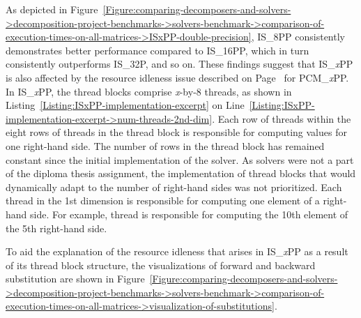 As depicted in Figure~\ref{Figure:comparing-decomposers-and-solvers->decomposition-project-benchmarks->solvers-benchmark->comparison-of-execution-times-on-all-matrices->ISxPP-double-precision}, IS\_8PP consistently demonstrates better performance compared to IS\_16PP, which in turn consistently outperforms IS\_32P, and so on. These findings suggest that IS\_\textit{x}PP is also affected by the resource idleness issue described on Page~\pageref{Paragraph:comparing-decomposers-and-solvers->decomposition-project-benchmarks->decomposers-benchmark->comparison-of-execution-times-on-subset-of-matrices->PCMxPP} for PCM\_\textit{x}PP. In IS\_\textit{x}PP, the thread blocks comprise \textit{x}-by-8 threads, as shown in Listing~\ref{Listing:ISxPP-implementation-excerpt} on Line~\ref{Listing:ISxPP-implementation-excerpt->num-threads-2nd-dim}. Each row of threads within the eight rows of threads in the thread block is responsible for computing values for one right-hand side. The number of rows in the thread block has remained constant since the initial implementation of the solver. As solvers were not a part of the diploma thesis assignment, the implementation of thread blocks that would dynamically adapt to the number of right-hand sides was not prioritized. Each thread in the 1st dimension is responsible for computing one element of a right-hand side. For example, thread  is responsible for computing the 10th element of the 5th right-hand side.

To aid the explanation of the resource idleness that arises in IS\_\textit{x}PP as a result of its thread block structure, the visualizations of forward and backward substitution are shown in Figure~\ref{Figure:comparing-decomposers-and-solvers->decomposition-project-benchmarks->solvers-benchmark->comparison-of-execution-times-on-all-matrices->visualization-of-substitutions}.

